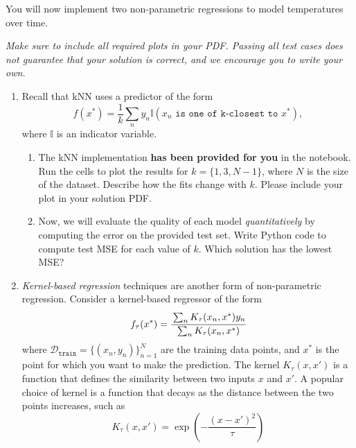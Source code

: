 \documentclass[submit]{harvardml}
\begin{document}
\begin{problem}

You will now implement two non-parametric regressions to model temperatures over time.  

\vspace{0.5cm}
\noindent\emph{Make sure to include all required plots in your PDF. Passing all test cases does not guarantee that your solution is correct, and we encourage you to write your own. }

\begin{enumerate}
\item 
 Recall that kNN uses a predictor of the form
\[
  f(x^*) = \frac{1}{k} \sum_n y_n \mathbb{I}(x_n \texttt{ is one of k-closest to } x^*),
\]
where $\mathbb{I}$ is an indicator variable. 
\begin{enumerate}

  \item The kNN implementation \textbf{has been provided for you} in the notebook. Run the cells to plot the results for $k=\{1, 3, N-1\}$, where $N$ is the size of the dataset. Describe how the fits change with $k$. Please include your plot in your solution PDF.

  \item Now, we will evaluate the quality of each model \emph{quantitatively} by computing the error on the provided test set. Write Python code to compute test MSE for each value of $k$.  Which solution has the lowest MSE? 
  
\end{enumerate}

\item \textit{Kernel-based regression} techniques are another form of non-parametric regression. Consider a kernel-based
regressor of the form 
\begin{equation*}
  f_\tau(x^*) = \cfrac{\sum_{n} K_\tau(x_n,x^*) y_n}{\sum_n K_\tau(x_n, x^*)}
\end{equation*}
where $\mathcal{D}_\texttt{train} = \{(x_n,y_n)\}_{n = 1} ^N$ are the
training data points, and $x^*$ is the point for which you want to
make the prediction.  The kernel $K_\tau(x,x')$ is a function that
defines the similarity between two inputs $x$ and $x'$. A popular
choice of kernel is a function that decays as the distance between the
two points increases, such as
\begin{equation*}
  K_\tau(x,x') = \exp\left(-\frac{(x-x')^2}{\tau}\right)
\end{equation*}


\end{enumerate}
\end{problem}
\end{document}
